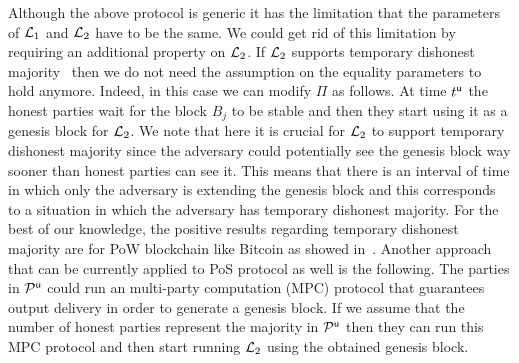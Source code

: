 Although the above protocol is generic it has the limitation that the parameters
of $\mathcal{L}_1$ and $\mathcal{L}_2$ have to be the same. We could get rid of this limitation by requiring an additional property on $\mathcal{L}_2$.
If $\mathcal{L}_2$ supports temporary dishonest majority~\cite{DBLP:journals/corr/abs-1908-00427} then we do not need the assumption on the equality parameters to 
hold anymore.
Indeed, in this case we can modify $\Pi$ as follows. At time $t^{\mathsf{u}}$ the honest parties wait for the block $B_j$ to be stable and then they start using it as a genesis 
block for $\mathcal{L}_2$.  We note that here it is crucial for $\mathcal{L}_2$ to support temporary dishonest majority since the adversary
could potentially see the genesis block way sooner than honest parties can see it. This means that there is an interval of time in which only the adversary is extending 
the genesis block and this corresponds to a situation in which the adversary has temporary dishonest majority.
For the best of our knowledge, the positive results regarding temporary dishonest majority are for PoW blockchain like Bitcoin as showed in~\cite{DBLP:journals/corr/abs-1908-00427}.
Another approach that can be currently applied to PoS protocol as well is the following. The parties in $\mathcal{P}^\mathsf{u}$ could run an multi-party computation (MPC) protocol
that guarantees output delivery in order to generate a genesis block. If we assume that the number of honest parties represent the majority in $\mathcal{P}^\mathsf{u}$
then they can run this MPC protocol and then start running $\mathcal{L}_2$ using the obtained genesis block.







